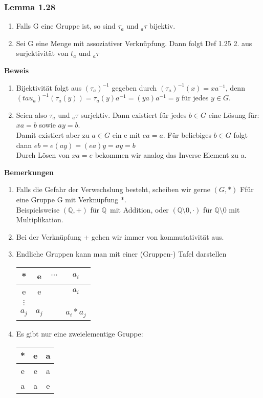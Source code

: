 \documentclass{article}
\newcommand{\Q}{\mathbb{Q}}
\newcommand{\mQ}{$\mathbb{Q}$\ }
\begin{document}
\subsubsection{Lemma 1.28}
\begin{enumerate}
\item{Falls G eine Gruppe ist, so sind $\tau_a$ und $_{a}\tau$ bijektiv.}
\item{Sei G eine Menge mit assoziativer Verknüpfung. Dann folgt Def 1.25 2. aus surjektivität von $t_a$ und $_{a}\tau$}
\end{enumerate}
\textbf{Beweis}\\
\begin{enumerate}
\item{
Bijektivität folgt aus  $(\tau_a)^{-1}$ gegeben durch $(\tau_a)^{-1}(x) = x a^{-1}$, denn $(tau_a)^{-1}(\tau_a(y)) = \tau_a(y)a^{-1} = (y a) a^{-1} = y$ für jedes $y \in G$.
}
\item{
 Seien also $\tau_a$ und $_{a}\tau$ surjektiv. Dann existiert für jedes $b \in G$ eine Lösung für:\\
 $x a = b$ sowie $a y = b$.\\
 Damit existiert aber zu $a \in G$ ein  e mit $ea = a$. Für beliebiges $b \in G$ folgt dann $e b = e (a y) = (e a) y = ay = b$\\
 Durch Lösen von $x a = e$ bekommen wir analog das Inverse Element zu a.
}
\end{enumerate}
\textbf{Bemerkungen}
\begin{enumerate}
\item{Falls die Gefahr der Verwechslung besteht, scheiben wir gerne $(G, *)$ Ffür eine Gruppe G mit Verknüpfung $*$.\\
Beispielsweise $(\Q, +)$ für \mQ mit Addition, oder $(\Q \setminus {0}, \cdot)$ für $\Q \setminus {0}$ mit Multiplikation.\\}
\item{Bei der Verknüpfung + gehen wir immer von kommutativität aus.}
\item{Endliche Gruppen kann man mit einer (Gruppen-) Tafel darstellen\\
\begin{tabular}{c || c | c | c}
* & e & $\cdots$ & $a_i$\\
\hline
\hline
e & e &        & $a_i$\\
\hline
$\vdots$ & & \\
\hline
$a_j$ & $a_j$& & $a_i * a_j$
\end{tabular}
}
\item{
Es gibt nur eine zweielementige Gruppe:\\
\begin{tabular}{c || c | c}
* & e & a\\
\hline
\hline
e & e & a\\
\hline
a & a & e
\end{tabular}
}
\end{enumerate}
\end{document}
